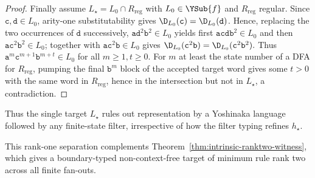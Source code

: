 \begin{proof}
Finally assume $L_\star=L_0\cap R_{\mathrm{reg}}$ with
$L_0\in\YSub{f}$ and $R_{\mathrm{reg}}$ regular.  Since
$\mathtt c,\mathtt d\in L_0$, arity-one substitutability gives
$\D_{L_0}(\mathtt c)=\D_{L_0}(\mathtt d)$.  Hence, replacing the two occurrences of $\mathtt d$ successively,
$\mathtt a\mathtt d^2\mathtt b^2\in L_0$ yields first
$\mathtt a\mathtt c\mathtt d\mathtt b^2\in L_0$ and then
$\mathtt a\mathtt c^2\mathtt b^2\in L_0$; together with
$\mathtt a\mathtt c^2\mathtt b\in L_0$ gives
\(\D_{L_0}(\mathtt c^2\mathtt b) =\D_{L_0}(\mathtt c^2\mathtt b^2).\)
Thus $\mathtt a^m\mathtt c^{m+1}\mathtt b^{m+t}\in L_0$ for all
$m\ge1,t\ge0$.  For $m$ at least the state number of a DFA for
$R_{\mathrm{reg}}$, pumping the final $\mathtt b^m$ block of the accepted
target word gives some $t>0$ with the same word in $R_{\mathrm{reg}}$, hence
in the intersection but not in $L_\star$, a contradiction.
\end{proof}

Thus the single target $L_\star$ rules out representation by a Yoshinaka
language followed by any finite-state filter, irrespective of how the filter
typing refines $h_\star$.

This rank-one separation complements
Theorem~\ref{thm:intrinsic-ranktwo-witness},
which gives a boundary-typed non-context-free
target of minimum rule rank two across all finite fan-outs.

